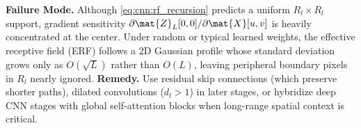 \documentclass[../../../../master.tex]{subfiles}
\begin{document}
\begin{pitfall}
\label{box:cnn:erf}
\textbf{Failure Mode.} Although \eqref{eq:cnn:rf_recursion} predicts a uniform $R_l \times R_l$ support, gradient sensitivity $\partial \mat{Z}_L[0,0] / \partial \mat{X}[u,v]$ is heavily concentrated at the center. Under random or typical learned weights, the effective receptive field (ERF) follows a 2D Gaussian profile whose standard deviation grows only as $O(\sqrt{L})$ rather than $O(L)$, leaving peripheral boundary pixels in $R_l$ nearly ignored.
\textbf{Remedy.} Use residual skip connections (which preserve shorter paths), dilated convolutions ($d_l > 1$) in later stages, or hybridize deep CNN stages with global self-attention blocks when long-range spatial context is critical.
\end{pitfall}
\end{document}
